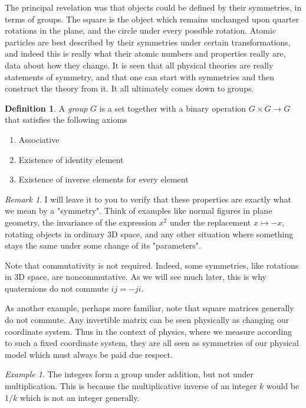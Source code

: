 \documentclass[12pt]{article}
\theoremstyle{definition}
\newtheorem{definition}{Definition}[section]
\theoremstyle{remark}
\newtheorem*{remark}{Remark}
\theoremstyle{example}
\newtheorem{example}{Example}
\begin{document}
The principal revelation was that objects could be defined by their symmetries, in terms of groups. The square is the object which remains unchanged upon quarter rotations in the plane, and the circle under every possible rotation. Atomic particles are best described by their symmetries under certain transformations, and indeed this is really what their atomic numbers and properties really are, data about how they change. It is seen that all physical theories are really statements of symmetry, and that one can start with symmetries and then construct the theory from it. It all ultimately comes down to groups.

\begin{definition}
	A \textit{group} $G$ is a set together with a binary operation $G\times G\to G$ that satisfies the following axioms
	\begin{enumerate}
		\item Associative
		\item Existence of identity element
		\item Existence of inverse elements for every element
	\end{enumerate}
\end{definition}

\begin{remark}
	I will leave it to you to verify that these properties are exactly what we mean by a "symmetry". Think of examples like normal figures in plane geometry, the invariance of the expression $x^2$ under the replacement $x\mapsto -x$, rotating objects in ordinary 3D space, and any other situation where something stays the same under some change of its "parameters".
	
	Note that commutativity is not required. Indeed, some symmetries, like rotations in 3D space, are noncommutative. As we will see much later, this is why quaternions do not commute $ij=-ji$.
	
	As another example, perhaps more familiar,  note that square matrices generally do not commute. Any invertible matrix can be seen physically as changing our coordinate system. Thus in the context of physics, where we measure according to such a fixed coordinate system, they are all seen as symmetries of our physical model which must always be paid due respect.
\end{remark}

\begin{example}
	The integers form a group under addition, but not under multiplication. This is because the multiplicative inverse of an integer $k$ would be $1/k$ which is not an integer generally.
\end{example}
\end{document}
